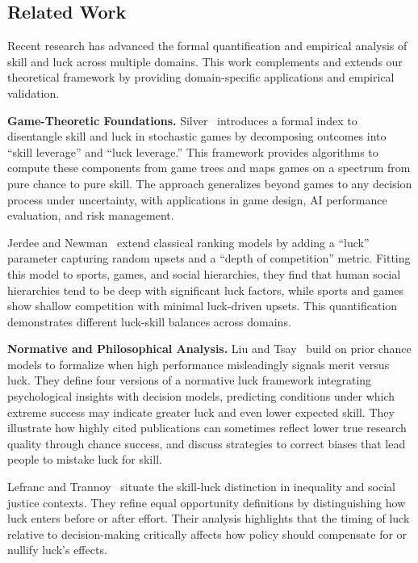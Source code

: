   \subsection{Related Work}

  Recent research has advanced the formal quantification and empirical
  analysis of skill and luck across multiple domains. This work complements
  and extends our theoretical framework by providing domain-specific
  applications and empirical validation.

  \textbf{Game-Theoretic Foundations.}
  Silver~\cite{silver2025} introduces a formal index to disentangle skill
  and luck in stochastic games by decomposing outcomes into ``skill leverage''
  and ``luck leverage.'' This framework provides algorithms to compute these
  components from game trees and maps games on a spectrum from pure chance
  to pure skill. The approach generalizes beyond games to any decision process
  under uncertainty, with applications in game design, AI performance evaluation,
  and risk management.

  Jerdee and Newman~\cite{jerdee2024} extend classical ranking models by
  adding a ``luck'' parameter capturing random upsets and a ``depth of competition''
  metric. Fitting this model to sports, games, and social hierarchies,
  they find that human social hierarchies tend to be deep with significant
  luck factors, while sports and games show shallow competition with minimal
  luck-driven upsets. This quantification demonstrates different luck-skill
  balances across domains.

  \textbf{Normative and Philosophical Analysis.}
  Liu and Tsay~\cite{liu2023} build on prior chance models to formalize
  when high performance misleadingly signals merit versus luck. They define
  four versions of a normative luck framework integrating psychological
  insights with decision models, predicting conditions under which extreme
  success may indicate greater luck and even lower expected skill. They
  illustrate how highly cited publications can sometimes reflect lower
  true research quality through chance success, and discuss strategies
  to correct biases that lead people to mistake luck for skill.

  Lefranc and Trannoy~\cite{lefranc2025} situate the skill-luck distinction
  in inequality and social justice contexts. They refine equal opportunity
  definitions by distinguishing how luck enters before or after effort.
  Their analysis highlights that the timing of luck relative to decision-making
  critically affects how policy should compensate for or nullify luck's effects.

